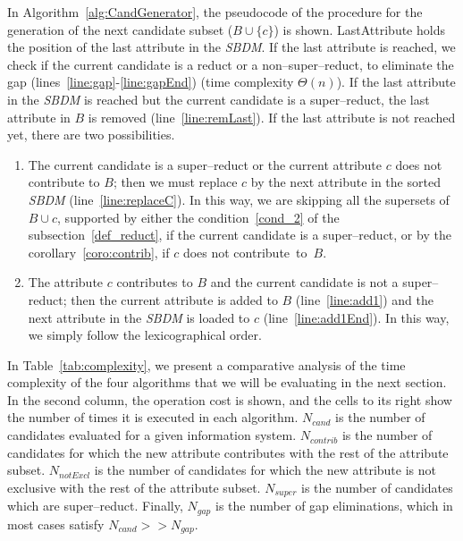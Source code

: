 \documentclass[number,preprint,review,12pt]{elsarticle}
\begin{document}
	In Algorithm~\ref{alg:CandGenerator}, the pseudocode of the procedure for the generation of the next candidate subset ($B\cup \lbrace c\rbrace$) is shown. LastAttribute holds the position of the last attribute in the \textit{SBDM}. If the last attribute is reached, we check if the current candidate is a reduct or a non--super--reduct, to eliminate the gap (lines~\ref{line:gap}-\ref{line:gapEnd}) (time complexity $\Theta(n)$). If the last attribute in the \textit{SBDM} is reached but the current candidate is a super--reduct, the last attribute in $B$ is removed (line~\ref{line:remLast}). If the last attribute is not reached yet, there are two possibilities. 
		
	\begin{enumerate}
		\item The current candidate is a super--reduct or the current attribute $c$ does not contribute to $B$; then we must replace $c$ by the next attribute in the sorted \textit{SBDM} (line~\ref{line:replaceC}). In this way, we are skipping all the supersets of $B\cup{c}$, supported by either the condition~\ref{cond_2} of the subsection~\ref{def_reduct}, if the current candidate is a super--reduct, or by the corollary~\ref{coro:contrib}, if $c$ does not contribute~to~$B$.
		\item The attribute $c$ contributes to $B$ and the current candidate is not a super--reduct; then the current attribute is added to $B$ (line~\ref{line:add1}) and the next attribute in the \textit{SBDM} is loaded to $c$ (line~\ref{line:add1End}). In this way, we simply follow the lexicographical order.
	\end{enumerate}  
	
	In Table~\ref{tab:complexity}, we present a comparative analysis of the time complexity of the four algorithms that we will be evaluating in the next section. In the second column, the operation cost is shown, and the cells to its right show the number of times it is executed in each algorithm. $N_{cand}$ is the number of candidates evaluated for a given information system. $N_{contrib}$ is the number of candidates for which the new attribute contributes with the rest of the attribute subset. $N_{notExcl}$ is the number of candidates for which the new attribute is not exclusive with the rest of the attribute subset. $N_{super}$ is the number of candidates which are super--reduct. Finally, $N_{gap}$ is the number of gap eliminations, which in most cases satisfy $N_{cand}>>N_{gap}$.
	
\end{document}
